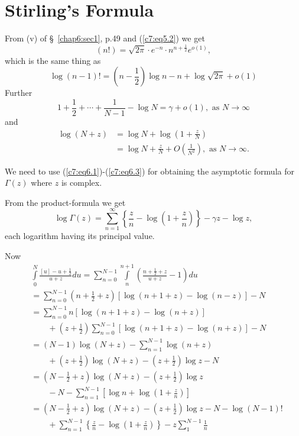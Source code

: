 \section[Stirling's Formula]{Stirling's Formula \cite[p.150]{key15}}\label{chap7:sec6}

From (v) of \S\ \ref{chap6:sec1}, p.49 and (\ref{c7:eq5.2}) we get
$$
(n!) = \sqrt{2\pi} \cdot e^{-n} \cdot n^{n+\frac{1}{2}} e^{o(1)},
$$
which is the same thing as 
\begin{equation*}
\log (n-1)! = \left(n - \frac{1}{2} \right) \log n - n + \log \sqrt{2\pi} + o(1)
\tag{6.1}\label{c7:eq6.1} 
\end{equation*}\pageoriginale 
Further
\begin{equation*}
1 + \frac{1}{2} + \cdots + \frac{1}{N-1} - \log N = \gamma + o (1),
\text{ as } N \to \infty \tag{6.2}\label{c7:eq6.2}
\end{equation*}
and 
\begin{align*}
\log (N+z) & = \log N + \log \left( 1+\frac{z}{N}\right)\\
& = \log N + \frac{z}{N} + O \left(\frac{1}{N^2} \right), \text{ as }
N \to \infty. \tag{6.3}\label{c7:eq6.3}
\end{align*}

We need to use (\ref{c7:eq6.1})-(\ref{c7:eq6.3}) for obtaining the asymptotic formula for
$\Gamma (z)$ where $z$ is complex.

From the product-formula we get
\begin{equation*}
\log \Gamma (z) = \sum\limits^\infty_{n=1} \left\{\frac{z}{n} - \log
\left(1+\frac{z}{n} \right) \right\}  - \gamma z - \log z, \tag{6.4}\label{c7:eq6.4}
\end{equation*}
each logarithm having its principal value.

Now
\begin{align*}
& \int\limits^N_0 \frac{[u] - u + \frac{1}{2}}{u+z} du =
\sum\limits^{N-1}_{n=0} \int\limits^{n+1}_n \left(\frac{n+\frac{1}{2}
  +z}{u+z} -1 \right) du\\
& = \sum\limits^{N-1}_{n=0} \left(n + \frac{1}{2}+z\right) [\log (n+1+z) -\log
  (n-z)] - N\\
& = \sum\limits^{N-1}_{n=0} n [\log (n+1+z) - \log (n+z)]\\
&\qquad + \left(z +
\frac{1}{2}\right) \sum\limits^{N-1}_{n=0}
\left[\log (n+1+z) - \log (n+z) \right] -N\\
& = (N-1) \log (N+z) - \sum\limits^{N-1}_{n=1} \log (n+z)\\
&\qquad +
\left(z+\frac{1}{2} \right) \log (N+z)
 - \left(z+\frac{1}{2} \right) \log z - N\\
& = \left(N - \frac{1}{2} + z \right) \log (N+z) - \left(z+\frac{1}{2}
\right) \log z\\
&\qquad - N - \sum\limits^{N-1}_{n=1} \left[\log n + \log
  \left(1+\frac{z}{n} \right) \right]\\
& = \left(N - \frac{1}{2} +z \right) \log(N+z) - \left(
z+\frac{1}{2}\right) \log  z - N - \log (N-1)!\\
& \qquad + \sum\limits^{N-1}_{n=1} \left\{\frac{z}{n} - \log
\left(1+\frac{z}{n} \right) \right\}  - z \sum\limits^{N-1}_{1}
\frac{1}{n}
\end{align*}\pageoriginale 

